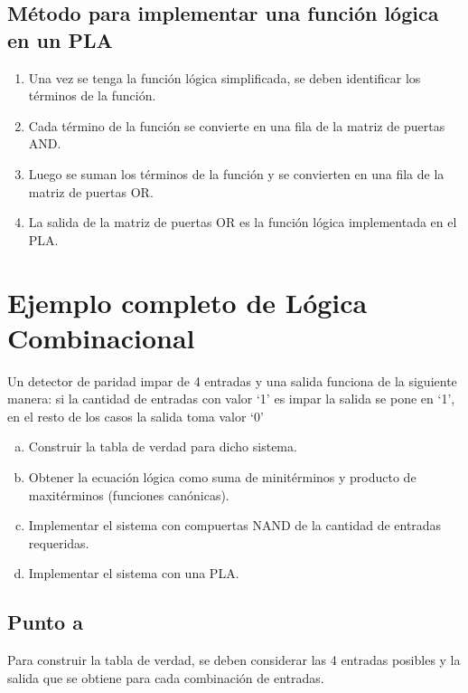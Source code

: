 \documentclass{article}
\begin{document}
\subsection*{Método para implementar una función lógica en un PLA}
\begin{mdframed}[backgroundcolor=red!40,shadow=true,shadowsize=2pt,roundcorner=2pt]
    \begin{enumerate}
        \item Una vez se tenga la función lógica simplificada, se deben identificar los términos de la función.
        \item Cada término de la función se convierte en una fila de la matriz de puertas AND.
        \item Luego se suman los términos de la función y se convierten en una fila de la matriz de puertas OR.
        \item La salida de la matriz de puertas OR es la función lógica implementada en el PLA.
    \end{enumerate}
\end{mdframed}

\newpage
\section*{Ejemplo completo de Lógica Combinacional}
Un detector de paridad impar de 4 entradas y una salida funciona de la siguiente manera: si la cantidad de entradas con valor ‘1’ es impar la salida se pone en ‘1’, en el resto de los casos la salida toma valor ‘0’
\begin{enumerate}[a)]
    \item Construir la tabla de verdad para dicho sistema.
    \item Obtener la ecuación lógica como suma de minitérminos y producto de maxitérminos (funciones canónicas).
    \item Implementar el sistema con compuertas NAND de la cantidad de entradas requeridas.
    \item Implementar el sistema con una PLA.
\end{enumerate}

\subsection*{Punto a}
Para construir la tabla de verdad, se deben considerar las 4 entradas posibles y la salida que se obtiene para cada combinación de entradas.
\end{document}
